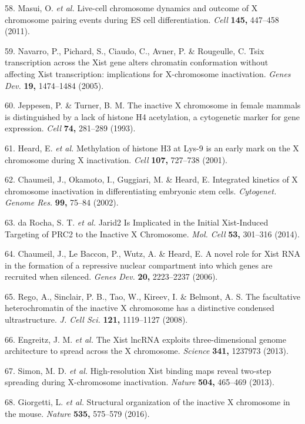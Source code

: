 \documentclass[11pt,twoside]{MPIthesis}
\theoremstyle{definition}
\theoremstyle{definition}
\theoremstyle{definition}
\theoremstyle{remark}
\begin{document}
58. Masui, O. \emph{et al.} Live-cell chromosome dynamics and outcome of
X chromosome pairing events during ES cell differentiation. \emph{Cell}
\textbf{145,} 447--458 (2011).

59. Navarro, P., Pichard, S., Ciaudo, C., Avner, P. \& Rougeulle, C.
Tsix transcription across the Xist gene alters chromatin conformation
without affecting Xist transcription: implications for X-chromosome
inactivation. \emph{Genes Dev.} \textbf{19,} 1474--1484 (2005).

60. Jeppesen, P. \& Turner, B. M. The inactive X chromosome in female
mammals is distinguished by a lack of histone H4 acetylation, a
cytogenetic marker for gene expression. \emph{Cell} \textbf{74,}
281--289 (1993).

61. Heard, E. \emph{et al.} Methylation of histone H3 at Lys-9 is an
early mark on the X chromosome during X inactivation. \emph{Cell}
\textbf{107,} 727--738 (2001).

62. Chaumeil, J., Okamoto, I., Guggiari, M. \& Heard, E. Integrated
kinetics of X chromosome inactivation in differentiating embryonic stem
cells. \emph{Cytogenet. Genome Res.} \textbf{99,} 75--84 (2002).

63. da Rocha, S. T. \emph{et al.} Jarid2 Is Implicated in the Initial
Xist-Induced Targeting of PRC2 to the Inactive X Chromosome. \emph{Mol.
Cell} \textbf{53,} 301--316 (2014).

64. Chaumeil, J., Le Baccon, P., Wutz, A. \& Heard, E. A novel role for
Xist RNA in the formation of a repressive nuclear compartment into which
genes are recruited when silenced. \emph{Genes Dev.} \textbf{20,}
2223--2237 (2006).

65. Rego, A., Sinclair, P. B., Tao, W., Kireev, I. \& Belmont, A. S. The
facultative heterochromatin of the inactive X chromosome has a
distinctive condensed ultrastructure. \emph{J. Cell Sci.} \textbf{121,}
1119--1127 (2008).

66. Engreitz, J. M. \emph{et al.} The Xist lncRNA exploits
three-dimensional genome architecture to spread across the X chromosome.
\emph{Science} \textbf{341,} 1237973 (2013).

67. Simon, M. D. \emph{et al.} High-resolution Xist binding maps reveal
two-step spreading during X-chromosome inactivation. \emph{Nature}
\textbf{504,} 465--469 (2013).

68. Giorgetti, L. \emph{et al.} Structural organization of the inactive
X chromosome in the mouse. \emph{Nature} \textbf{535,} 575--579 (2016).
\end{document}

